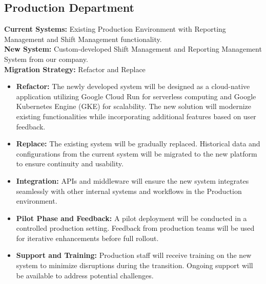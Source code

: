 \subsection{Production Department}
\textbf{Current Systems:} Existing Production Environment with Reporting Management and Shift Management functionality. \\
\textbf{New System:} Custom-developed Shift Management and Reporting Management System from our company. \\
\textbf{Migration Strategy:} Refactor and Replace
\begin{itemize}
    \item \textbf{Refactor:} The newly developed system will be designed as a cloud-native application utilizing Google Cloud Run for serverless computing and Google Kubernetes Engine (GKE) for scalability. The new solution will modernize existing functionalities while incorporating additional features based on user feedback.
    \item \textbf{Replace:} The existing system will be gradually replaced. Historical data and configurations from the current system will be migrated to the new platform to ensure continuity and usability.
    \item \textbf{Integration:} APIs and middleware will ensure the new system integrates seamlessly with other internal systems and workflows in the Production environment.
    \item \textbf{Pilot Phase and Feedback:} A pilot deployment will be conducted in a controlled production setting. Feedback from production teams will be used for iterative enhancements before full rollout.
    \item \textbf{Support and Training:} Production staff will receive training on the new system to minimize disruptions during the transition. Ongoing support will be available to address potential challenges.
\end{itemize}

